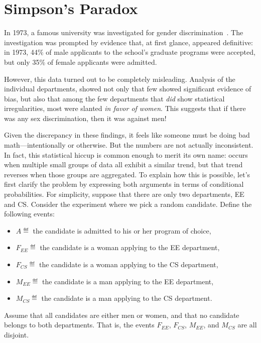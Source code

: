 \section{Simpson's Paradox}\label{discrimination_subsec}

In 1973, a famous university was investigated for gender
discrimination~\cite{Berkeley75}.  The investigation was prompted by
evidence that, at first glance, appeared definitive: in 1973, 44\% of
male applicants to the school's graduate programs were accepted, but
only 35\% of female applicants were admitted.

However, this data turned out to be completely misleading.  Analysis
of the individual departments, showed not only that few showed
significant evidence of bias, but also that among the few departments
that \emph{did} show statistical irregularities, most were slanted
\emph{in favor of women}.  This suggests that if there was any sex
discrimination, then it was against men!

Given the discrepancy in these findings, it feels like someone must be
doing bad math---intentionally or otherwise.  But the numbers are not
actually inconsistent.  In fact, this statistical hiccup is common
enough to merit its own name:  occurs when
multiple small groups of data all exhibit a similar trend, but that
trend reverses when those groups are aggregated.  To explain how this
is possible, let's first clarify the problem by expressing both
arguments in terms of conditional probabilities.  For simplicity,
suppose that there are only two departments, EE and CS.  Consider the
experiment where we pick a random candidate.  Define the following
events:
%
\begin{itemize}
\item $A \eqdef$ the candidate is admitted to his or her program of choice,
\item $F_{EE} \eqdef$ the candidate is a woman applying to the EE department,
\item $F_{CS} \eqdef$ the candidate is a woman applying to the CS department,
\item $M_{EE} \eqdef$ the candidate is a man applying to the EE department,
\item $M_{CS} \eqdef$ the candidate is a man applying to the CS department.
\end{itemize}
Assume that all candidates are either men or women, and that no
candidate belongs to both departments. That is,  the events $F_{EE}$,
$F_{CS}$, $M_{EE}$, and $M_{CS}$ are all disjoint.

